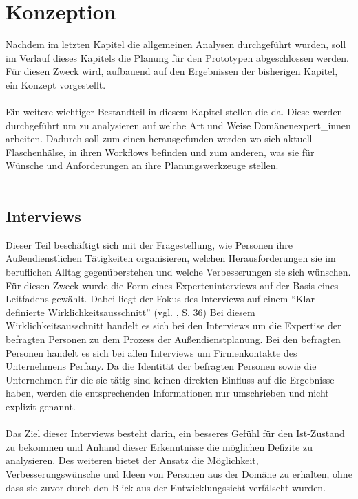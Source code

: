 \documentclass[Bachelorarbeit.tex]{subfiles}
\begin{document}
\chapter{Konzeption}
\label{chap:entwicklung}
Nachdem im letzten Kapitel die allgemeinen Analysen durchgeführt wurden, soll im Verlauf dieses Kapitels die Planung für den Prototypen abgeschlossen werden.
Für diesen Zweck wird, aufbauend auf den Ergebnissen der bisherigen Kapitel, ein Konzept vorgestellt.\\
\\
Ein weitere wichtiger Bestandteil in diesem Kapitel stellen die  da.
Diese  werden durchgeführt um zu analysieren auf welche Art und Weise  Domänenexpert\_innen arbeiten.
Dadurch soll zum einen herausgefunden werden wo sich aktuell Flaschenhälse, in ihren Workflows befinden und zum anderen, was sie für Wünsche und Anforderungen an ihre Planungswerkzeuge stellen.\\
\\

\section{Interviews}
\label{chap:analyse:sec:interviews}
Dieser Teil beschäftigt sich mit der Fragestellung, wie Personen ihre Außendienstlichen Tätigkeiten organisieren, welchen Herausforderungen sie im beruflichen Alltag gegenüberstehen und welche Verbesserungen sie sich wünschen. 
Für diesen Zweck wurde die Form eines Experteninterviews auf der Basis eines Leitfadens gewählt.
Dabei liegt der Fokus des Interviews auf einem "`Klar definierte Wirklichkeitsausschnitt"' (vgl. \cite{Mayer2006}, S. 36)
Bei diesem Wirklichkeitsausschnitt handelt es sich bei den Interviews um die Expertise der befragten Personen zu dem Prozess der Außendienstplanung.
Bei den befragten Personen handelt es sich bei allen Interviews um Firmenkontakte des Unternehmens Perfany.
Da die Identität der befragten Personen sowie die Unternehmen für die sie tätig sind keinen direkten Einfluss auf die Ergebnisse haben, werden die entsprechenden Informationen nur umschrieben und nicht explizit genannt.\\
\\
Das Ziel dieser Interviews besteht darin, ein besseres Gefühl für den Ist-Zustand zu bekommen und Anhand dieser Erkenntnisse die möglichen Defizite zu analysieren.
Des weiteren bietet der Ansatz die Möglichkeit, Verbesserungswünsche und Ideen von Personen aus der Domäne zu erhalten, ohne dass sie zuvor durch den Blick aus der Entwicklungssicht verfälscht wurden.
\end{document}

